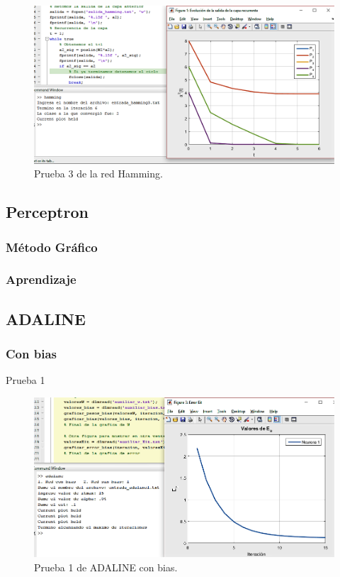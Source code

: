 \documentclass[12pt, titlepage]{article}
\begin{document}
            \begin{figure}[H]
                \begin{center}
                    \includegraphics[width=16cm]{img/hamming/hamming3.png}
                    \caption{Prueba 3 de la red Hamming.}
                    \label{fig:hamming3}
                \end{center}
            \end{figure}
        \subsection{Perceptron}
            \subsubsection{Método Gráfico}
            \subsubsection{Aprendizaje}
        \subsection{ADALINE}
            \subsubsection{Con bias}
            Prueba 1
            \begin{figure}[H]
                \begin{center}
                    \includegraphics[width=16cm]{img/adaline1/error.png}
                    \caption{Prueba 1 de ADALINE con bias.}
                    \label{fig:adaline1error}
                \end{center}
            \end{figure}
            
\end{document}
